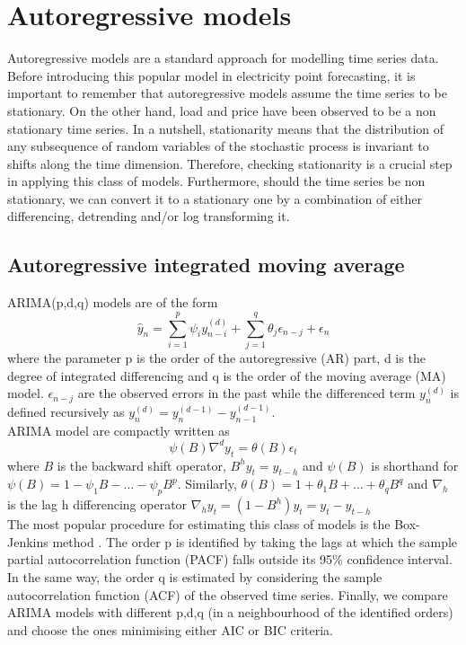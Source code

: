 \section{Autoregressive models}
Autoregressive models are a standard approach for modelling time series data.
Before introducing this popular model in electricity point forecasting, it is important to remember that autoregressive models assume the time series to be stationary. On the other hand, load and price have been observed to be a non stationary time series. 
In a nutshell, stationarity means that the distribution of any subsequence of random variables of the stochastic process is invariant to shifts along the time dimension.
Therefore, checking stationarity is a crucial step in applying this class of models. %
Furthermore, should the time series be non stationary, we can convert it to a stationary one by a combination of either differencing, detrending and/or log transforming it.
\subsection{Autoregressive integrated moving average}
ARIMA(p,d,q) models are of the form
\begin{equation}
    \hat{y}_n=\sum\limits_{i=1}^{p}\psi_i y_{n-i}^{(d)}+\sum\limits_{j=1}^{q}\theta_j \epsilon_{n-j}+\epsilon_n
\end{equation}
where the parameter p is the order of the autoregressive (AR) part, d is the degree of integrated differencing and q is the order of the moving average (MA) model. $\epsilon_{n-j}$ are the observed errors in the past while the differenced term $y_n^{(d)}$ is defined recursively as $y_n^{(d)}=y_n^{(d-1)}-y_{n-1}^{(d-1)}$.
\\
ARIMA model are compactly written as
\begin{equation}
    \psi(B)\nabla^d y_t=\theta(B)\epsilon_t
\end{equation}
where $B$ is the backward shift operator, $B^h y_t=y_{t-h}$ and $\psi(B)$ is shorthand for $\psi(B)=1-\psi_1B-\dots-\psi_p B^p$.
Similarly, $\theta(B)=1+\theta_1B+\dots+\theta_q B^q$ and $\nabla_h$ is the lag h differencing operator $\nabla_h y_t=(1-B^h)y_t=y_t-y_{t-h}$
\\
The most popular procedure for estimating this class of models is the Box-Jenkins method \cite{box2015time}.
The order p is identified by taking the lags at which the sample partial autocorrelation function (PACF) falls outside its 95\% confidence interval.
In the same way, the order q is estimated by considering the sample autocorrelation function (ACF) of the observed time series. Finally, we compare ARIMA models with different p,d,q (in a neighbourhood of the identified orders) and choose the ones minimising either AIC or BIC criteria. 

